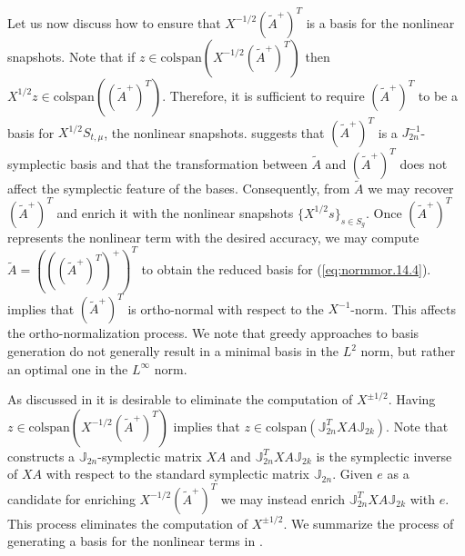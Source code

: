 {Let us now discuss how to ensure that $X^{-1/2} (\tilde A^+)^T$ is a basis for the nonlinear snapshots. Note that if $z \in \text{colspan}\left(X^{-1/2} (\tilde A^+)^T\right)$ then $X^{1/2} z \in \text{colspan}\left(( \tilde A^+)^T \right)$. Therefore, it is sufficient to require $(\tilde A^+)^T$ to be a basis for $X^{1/2}S_{t,\mu}$, the nonlinear snapshots.  suggests that $(\tilde A^+)^T$ is a $J_{2n}^{-1}$-symplectic basis and that the transformation between $\tilde A$ and $(\tilde A^+)^T $ does not affect the symplectic feature of the bases. Consequently, from $\tilde A$ we may recover $(\tilde A^+)^T$ and enrich it with the nonlinear snapshots $\{ X^{1/2} s \}_{s\in S_{g}}$. Once $(\tilde A^+)^T$ represents the nonlinear term with the desired accuracy, we may compute $\tilde A= \left( \left( ( \tilde A^+ )^T \right)^+ \right)^T$ to obtain the reduced basis for (\ref{eq:normmor.14.4}).  implies that $(\tilde A^+)^T$ is ortho-normal with respect to the $X^{-1}$-norm. This affects the ortho-normalization process. We note that greedy approaches to basis generation do not generally result in a minimal basis in the $L^{2}$ norm, but rather an optimal one in the $L^{\infty}$ norm.

As discussed in  it is desirable to eliminate the computation of $X^{\pm 1/2}$. Having $z \in \text{colspan}\left(X^{-1/2} (\tilde A^+)^T\right)$ implies that $z \in \text{colspan}(\mathbb J_{2n}^T X A \mathbb J_{2k})$. Note that  constructs a $\mathbb J_{2n}$-symplectic matrix $XA$ and $\mathbb J_{2n}^T X A \mathbb J_{2k}$ is the symplectic inverse of $XA$ with respect to the standard symplectic matrix $\mathbb J_{2n}$. Given $e$ as a candidate for enriching $X^{-1/2} (\tilde A^+)^T$ we may instead enrich $\mathbb J_{2n}^T X A \mathbb J_{2k}$ with $e$. This process eliminates the computation of $X^{\pm 1/2}$. We summarize the process of generating a basis for the nonlinear terms in .
}

